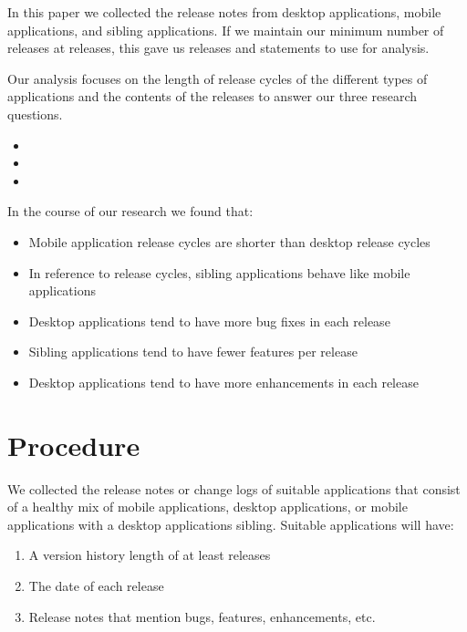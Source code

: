 \documentclass{acm_proc_article-sp}
\begin{document}
In this paper we collected the release notes from \NumDesktopApps desktop applications, \NumMobileApps mobile applications, and \NumSiblingpApps sibling applications. 
If we maintain our minimum number of releases at \MinNumReleases releases, this gave us \TotalNumReleases releases and \TotalNumStatements statements to use for analysis.

Our analysis focuses on the length of release cycles of the different types of applications and the contents of the releases to answer our three research questions.

\begin{itemize}
\item \RQOne
\item \RQTwo
\item \RQThree
\end{itemize}

In the course of our research we found that:
\begin{itemize}
\item Mobile application release cycles are shorter than desktop release cycles
\item In reference to release cycles, sibling applications behave like mobile applications
\item Desktop applications tend to have more bug fixes in each release
\item Sibling applications tend to have fewer features per release
\item Desktop applications tend to have more enhancements in each release
\end{itemize}


\section{Procedure}
We collected the release notes or change logs of suitable applications that consist of a healthy mix of mobile applications, desktop applications, or  mobile applications with a desktop applications sibling. 
Suitable applications will have:

\begin{enumerate}
	\item A version history length of at least \MinNumReleases releases
	\item The date of each release
	\item Release notes that mention bugs, features, enhancements, etc.
\end{enumerate}
\end{document}

